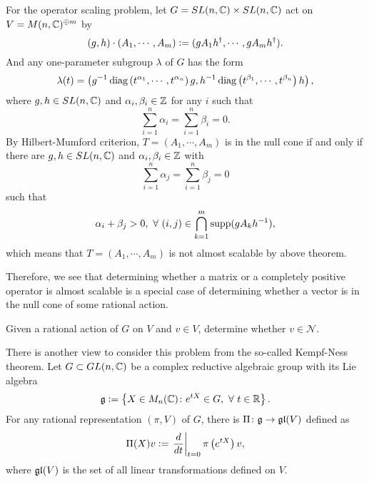 \documentclass[suri,pdfbookmark]{engsuribt} %
\begin{document}
  For the operator scaling problem, let $G = SL(n,\mathbb{C}) \times SL(n,\mathbb{C})$ act on $V = M(n,\mathbb{C})^{\oplus m}$ by
  \begin{equation*}
    (g,h) \cdot (A_1,\cdots,A_m) \vcentcolon= (gA_1h^{\dagger},\cdots,gA_mh^{\dagger}).
  \end{equation*}
  And any one-parameter subgroup $\lambda$ of $G$ has the form
  \begin{equation*}
    \lambda(t) = \left(g^{-1}\operatorname{diag}\left(t^{\alpha_1},\cdots,t^{\alpha_n}\right)g,h^{-1}\operatorname{diag}\left(t^{\beta_1},\cdots,t^{\beta_n}\right)h\right),
  \end{equation*}
  where $g,h \in SL(n,\mathbb{C})$ and $\alpha_i,\beta_i \in \mathbb{Z}$ for any $i$ such that
  \begin{equation*}
    \sum_{i=1}^n \alpha_i = \sum_{i=1}^n \beta_i = 0.
  \end{equation*}
  By Hilbert-Mumford criterion, $T = (A_1,\cdots,A_m)$ is in the null cone if and only if there are $g,h \in SL(n,\mathbb{C})$ and $\alpha_i,\beta_i \in \mathbb{Z}$ with
  \begin{equation*}
    \sum_{i=1}^n \alpha_j = \sum_{i=1}^n \beta_j = 0
  \end{equation*}
  such that
  \begin{equation*}
    \alpha_i+\beta_j > 0,~\forall~ (i,j) \in \bigcap_{k=1}^m\operatorname{supp}(gA_kh^{-1}),
  \end{equation*}
  which means that $T = (A_1,\cdots,A_m)$ is not almost scalable by above theorem. 

  Therefore, we see that determining whether a matrix or a completely positive operator is almost scalable is a special case of determining whether a vector is in the null cone of some rational action.
  \begin{prob}
    Given a rational action of $G$ on $V$ and $v \in V$, determine whether $v \in \mathcal{N}$.
  \end{prob}

  There is another view to consider this problem from the so-called Kempf-Ness theorem. Let $G \subset GL(n,\mathbb{C})$ be a complex reductive algebraic group with its Lie algebra
  \begin{equation*}
    \mathfrak{g} \vcentcolon= \left\{X \in M_n(\mathbb{C}) \colon e^{tX} \in G,~\forall~t \in \mathbb{R}\right\}.
  \end{equation*}
  For any rational representation $(\pi,V)$ of $G$, there is $\Pi \colon \mathfrak{g} \rightarrow \mathfrak{gl}(V)$ defined as
  \begin{equation*}
    \Pi(X) v  \vcentcolon=   \left.\frac{d}{dt}\right\lvert_{t=0} \pi\left(e^{tX}\right)v,
  \end{equation*}
  where $\mathfrak{gl}(V)$ is the set of all linear transformations defined on $V$. 
\end{document}
